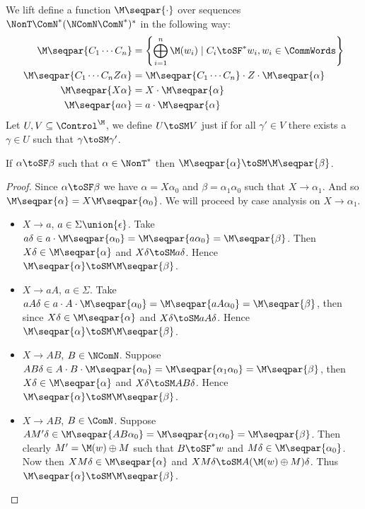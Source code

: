 We lift define a function $\M\seqpar{\cdot}$ over sequences $\NonT\ComN^*(\NComN\ComN^*)^*$ in the following way:
\begin{align*}
\M\seqpar{C_1\cdots C_n}         &= \left\{ \bigoplus_{i=1}^n \M(w_i) \mid C_i \toSF^* w_i, w_i \in \CommWords\right\}\\
\M\seqpar{C_1\cdots C_n Z\alpha} &= \M\seqpar{C_1\cdots C_n} \cdot Z \cdot \M\seqpar{\alpha}\\
\M\seqpar{X\alpha} &= X \cdot \M\seqpar{\alpha}\\
\M\seqpar{a\alpha} &= a \cdot \M\seqpar{\alpha}\\
\end{align*}
Let $U,V \subseteq \Control^\M$, we define $U \toSM V$ just if for all $\gamma' \in V$ there exists a $\gamma \in U$ such that $\gamma \toSM \gamma'$.
\begin{lemma}\label{apx:lemma:mseqpar_sim_SF}
If $\alpha \toSF \beta$ such that $\alpha \in \NonT^*$ then $\M\seqpar{\alpha} \toSM \M\seqpar{\beta}$.
\end{lemma}
\begin{proof}
Since $\alpha \toSF \beta$ we have $\alpha = X\alpha_0$ and $\beta = \alpha_1\alpha_0$ such that 
$X \rightarrow \alpha_1$. And so $\M\seqpar{\alpha} = X\M\seqpar{\alpha_0}$. We will proceed by case analysis on $X \rightarrow \alpha_1$.
\begin{itemize}
 	\item $X \rightarrow a$, $a \in \Sigma \union \{\epsilon\}$. \newline 
 		  Take $a\delta \in a\cdot\M\seqpar{\alpha_0} = \M\seqpar{a\alpha_0} = \M\seqpar{\beta}$.
 		  Then $X\delta \in \M\seqpar{\alpha}$ and $X\delta \toSM a\delta$. Hence $\M\seqpar{\alpha} \toSM \M\seqpar{\beta}$.
 	\item $X \rightarrow aA$, $a \in \Sigma$. \newline 
 		  Take $aA\delta \in a\cdot A\cdot\M\seqpar{\alpha_0} = \M\seqpar{aA\alpha_0} = \M\seqpar{\beta}$, then since
 		  $X\delta \in \M\seqpar{\alpha}$ and $X\delta \toSM aA\delta$. Hence $\M\seqpar{\alpha} \toSM \M\seqpar{\beta}$.	 
 	\item $X \rightarrow AB$, $B \in \NComN$. \newline 
 		  Suppose $AB\delta \in A \cdot B \cdot \M\seqpar{\alpha_0} = \M\seqpar{\alpha_1\alpha_0} = \M\seqpar{\beta}$, then
 		  $X\delta \in \M\seqpar{\alpha}$ and $X\delta \toSM AB\delta$. Hence $\M\seqpar{\alpha} \toSM \M\seqpar{\beta}$.	
 	\item $X \rightarrow AB$, $B \in \ComN$. \newline 
 		  Suppose ${A M'\delta \in \M\seqpar{AB\alpha_0}} = \M\seqpar{\alpha_1\alpha_0} = \M\seqpar{\beta}$. Then clearly ${M' = \M(w) \oplus M}$ such that $B \toSF^* w$ and $M\delta \in \M\seqpar{\alpha_0}$.
 		  Now then $X M\delta \in \M\seqpar{\alpha}$ and $X M\delta \toSM A(\M(w) \oplus M)\delta$.
 		  Thus $\M\seqpar{\alpha} \toSM \M\seqpar{\beta}$.	 	   
 \end{itemize} 

\end{proof}

